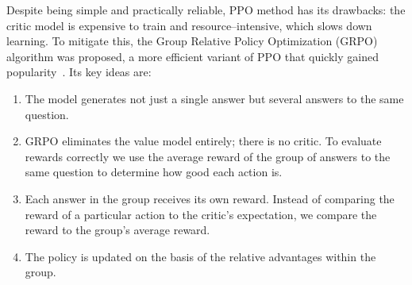 \documentclass{article}
\numberwithin{equation}{section}
\begin{document}
Despite being simple and practically reliable, PPO method has its drawbacks: the critic model is expensive to train and resource--intensive, which slows down learning. To mitigate this, the Group Relative Policy Optimization (GRPO) algorithm was proposed, a more efficient
variant of PPO that quickly gained popularity~\cite{shao2024deepseekmath, guo2025deepseek}. Its key ideas are:
\begin{enumerate}
  \item The model generates not just a single answer but several
    answers to the same question.
  \item GRPO eliminates the value model entirely; there is no critic. To evaluate rewards correctly we use the average reward of the group of answers to the same question to determine how good each action is.
  \item Each answer in the group receives its own reward. Instead of comparing the reward of a particular action to the critic's expectation, we compare the reward to the group's average reward.
  \item The policy is updated on the basis of the relative
    advantages within the group.
\end{enumerate}
\end{document}
